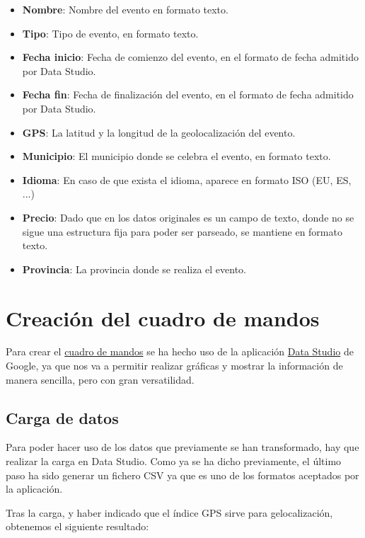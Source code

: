 \documentclass{\ClassPath/viu-tfm-template}
\begin{document}
\begin{itemize}
    \item \textbf{Nombre}: Nombre del evento en formato texto.
    \item \textbf{Tipo}: Tipo de evento, en formato texto.
    \item \textbf{Fecha inicio}: Fecha de comienzo del evento, en el formato de fecha admitido por Data Studio.
    \item \textbf{Fecha fin}: Fecha de finalización del evento, en el formato de fecha admitido por Data Studio.
    \item \textbf{GPS}: La latitud y la longitud de la geolocalización del evento.
    \item \textbf{Municipio}: El municipio donde se celebra el evento, en formato texto.
    \item \textbf{Idioma}: En caso de que exista el idioma, aparece en formato ISO (EU, ES, ...)
    \item \textbf{Precio}: Dado que en los datos originales es un campo de texto, donde no se sigue una estructura fija para poder ser parseado, se mantiene en formato texto.
    \item \textbf{Provincia}: La provincia donde se realiza el evento.
\end{itemize}


\chapter{Creación del cuadro de mandos}

Para crear el \href{https://datastudio.google.com/reporting/2322c44e-ad75-4243-a4a5-257be6d754bf/page/9AT6C}{cuadro de mandos} se ha hecho uso de la aplicación \href{https://datastudio.google.com/}{Data Studio} de Google, ya que nos va a permitir realizar gráficas y mostrar la información de manera sencilla, pero con gran versatilidad.

\section{Carga de datos}
Para poder hacer uso de los datos que previamente se han transformado, hay que realizar la carga en Data Studio. Como ya se ha dicho previamente, el último paso ha sido generar un fichero CSV ya que es uno de los formatos aceptados por la aplicación.

Tras la carga, y haber indicado que el índice GPS sirve para gelocalización, obtenemos el siguiente resultado:
\end{document}
